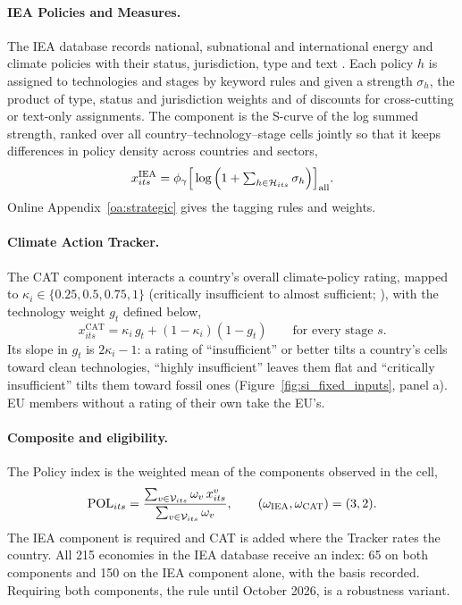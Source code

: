 \paragraph{IEA Policies and Measures.}\label{subsec:policy_iea} The IEA database records national,
subnational and international energy and climate policies with their status, jurisdiction, type and
text \citep{iea2026pams}. Each policy $h$ is assigned to technologies and stages by keyword rules and
given a strength $\sigma_h$, the product of type, status and jurisdiction weights and of discounts
for cross-cutting or text-only assignments. The component is the S-curve of the log summed strength,
ranked over all country--technology--stage cells jointly so that it keeps differences in policy
density across countries and sectors,
\begin{equation}\label{eq:iea_index}
  x^{\mathrm{IEA}}_{its}={\phi_{\gamma}}\Big[\log\Big(1+\textstyle\sum_{h\in\mathcal{H}_{its}}\sigma_h\Big)
  \Big]_{\mathrm{all}}.
\end{equation}
Online Appendix~\ref{oa:strategic} gives the tagging rules and weights.

\paragraph{Climate Action Tracker.}\label{subsec:policy_cat} The CAT component interacts a country's
overall climate-policy rating, mapped to $\kappa_i\in\{0.25,0.5,0.75,1\}$ (critically insufficient
to almost sufficient; \citealp{cat2026ratings}), with the technology weight $g_t$ defined below,
\begin{equation}\label{eq:cat}
  x^{\mathrm{CAT}}_{its}=\kappa_i\,g_t+(1-\kappa_i)(1-g_t)\qquad\text{for every stage } s.
\end{equation}
Its slope in $g_t$ is $2\kappa_i-1$: a rating of ``insufficient'' or better tilts a country's cells
toward clean technologies, ``highly insufficient'' leaves them flat and ``critically insufficient''
tilts them toward fossil ones (Figure~\ref{fig:si_fixed_inputs}, panel a). EU members without a
rating of their own take the EU's.

\paragraph{Composite and eligibility.} The Policy index is the weighted mean of the components
observed in the cell,
\begin{equation}\label{eq:pol_composite}
  \mathrm{POL}_{its}=\frac{\sum_{v\in\mathcal{V}_{its}}\omega_v\,x^{v}_{its}}
                  {\sum_{v\in\mathcal{V}_{its}}\omega_v},\qquad
  (\omega_{\mathrm{IEA}},\omega_{\mathrm{CAT}})=(3,2).
\end{equation}
The IEA component is required and CAT is added where the Tracker rates the country. All 215
economies in the IEA database receive an index: 65 on both components and 150 on the IEA component
alone, with the basis recorded. Requiring both components, the rule until October 2026, is a
robustness variant.

